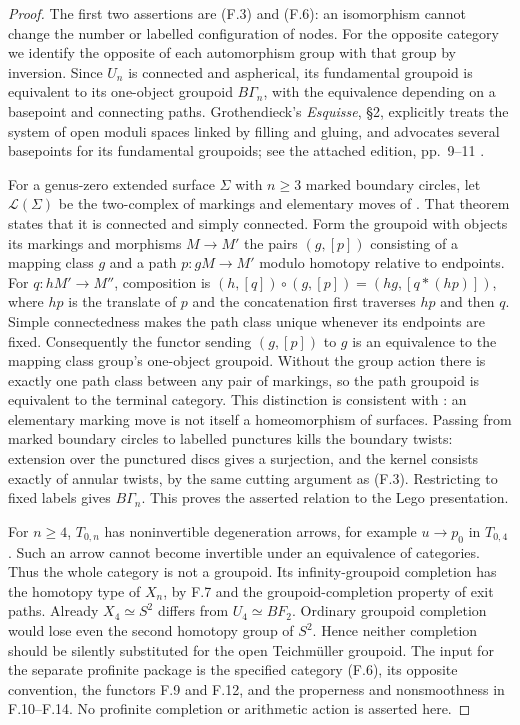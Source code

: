 \begin{proof}
The first two assertions are (F.3) and (F.6): an isomorphism cannot
change the number or labelled configuration of nodes.  For the
opposite category we identify the opposite of each automorphism group
with that group by inversion.  Since $U_n$
is connected and aspherical, its fundamental groupoid is equivalent
to its one-object groupoid $B\Gamma_n$, with the equivalence depending
on a basepoint and connecting paths.  Grothendieck's
\emph{Esquisse}, \S2, explicitly treats the system of open moduli
spaces linked by filling and gluing, and advocates several basepoints
for its fundamental groupoids; see the attached edition,
pp.~9--11 \citep{FGrothendieckEsquisse1984}.

For a genus-zero extended surface $\Sigma$ with $n\geq3$ marked
boundary circles, let $\mathcal L(\Sigma)$ be the
two-complex of markings and elementary moves of
\citet[Main Theorem 4.9]{FBakalovKirillov2000}.  That theorem states
that it is connected and simply connected.  Form the groupoid with
objects its markings and morphisms $M\to M'$ the pairs $(g,[p])$
consisting of a mapping class $g$ and a path $p:gM\to M'$ modulo
homotopy relative to endpoints.  For $q:hM'\to M''$, composition is
$(h,[q])\circ(g,[p])=(hg,[q*(hp)])$, where $hp$ is the translate of
$p$ and the concatenation first traverses $hp$ and then $q$.
Simple connectedness makes the path class unique whenever its endpoints
are fixed.  Consequently the functor sending $(g,[p])$ to $g$ is an
equivalence to the mapping class group's one-object groupoid.  Without
the group action there is exactly one path class between any pair of
markings, so the path groupoid is equivalent to the terminal category.
This distinction is consistent with
\citet[Remark 4.3]{FBakalovKirillov2000}: an elementary marking move
is not itself a homeomorphism of surfaces.
Passing from marked boundary circles to labelled punctures kills the
boundary twists:
extension over the punctured discs gives a surjection, and the
kernel consists exactly of annular twists, by the same cutting
argument as (F.3).  Restricting to fixed labels gives $B\Gamma_n$.
This proves the asserted relation to the Lego presentation.

For $n\geq4$, $T_{0,n}$ has noninvertible degeneration arrows, for
example $u\to p_0$ in $T_{0,4}$.  Such an arrow cannot become
invertible under an equivalence of categories.  Thus the whole
category is not a groupoid.  Its infinity-groupoid completion has
the homotopy type of $X_n$, by F.7 and the groupoid-completion
property of exit paths.  Already $X_4\simeq S^2$ differs from
$U_4\simeq BF_2$.  Ordinary groupoid completion would lose even the
second homotopy group of $S^2$.  Hence neither completion should be
silently substituted for the open Teichm\"uller groupoid.
The input for the separate profinite package is the specified
category (F.6), its opposite convention, the functors F.9 and F.12,
and the properness and nonsmoothness in F.10--F.14.  No profinite
completion or arithmetic action is asserted here.
\end{proof}
